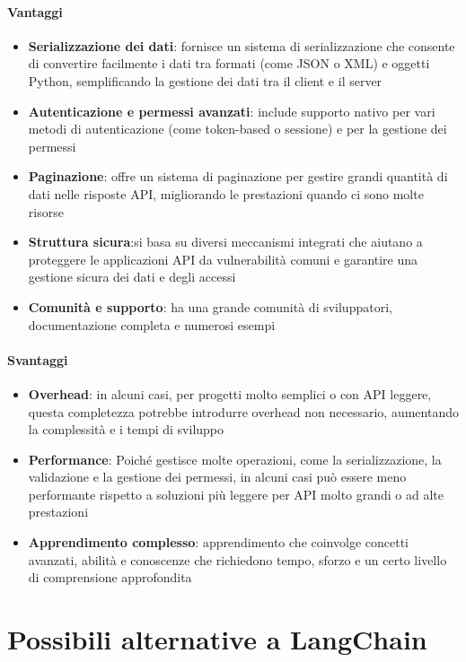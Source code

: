 \documentclass{article}
\begin{document}
\paragraph*{Vantaggi}
\begin{itemize}
    \item \textbf{Serializzazione dei dati}: fornisce un sistema di 
    serializzazione che consente di convertire facilmente i dati tra 
    formati (come JSON o XML) e oggetti Python, semplificando la 
    gestione dei dati tra il client e il server
    \item \textbf{Autenticazione e permessi avanzati}: include supporto 
    nativo per vari metodi di autenticazione (come token-based o 
    sessione) e per la gestione dei permessi
    \item \textbf{Paginazione}: offre un sistema di paginazione per 
    gestire grandi quantità di dati nelle risposte API, migliorando 
    le prestazioni quando ci sono molte risorse
    \item \textbf{Struttura sicura}:si basa su diversi meccanismi 
    integrati che aiutano a proteggere le applicazioni API da 
    vulnerabilità comuni e garantire una gestione sicura dei dati e 
    degli accessi
    \item \textbf{Comunità e supporto}: ha una grande comunità di 
    sviluppatori, documentazione completa e numerosi esempi
\end{itemize}
\paragraph*{Svantaggi}
\begin{itemize}
    \item \textbf{Overhead}: in alcuni casi, per progetti molto semplici 
    o con API leggere, questa completezza potrebbe introdurre overhead 
    non necessario, aumentando la complessità e i tempi di sviluppo
    \item \textbf{Performance}: Poiché  gestisce molte operazioni, come 
    la serializzazione, la validazione e la gestione dei permessi, in 
    alcuni casi può essere meno performante rispetto a soluzioni più 
    leggere per API molto grandi o ad alte prestazioni
    \item \textbf{Apprendimento complesso}: apprendimento che coinvolge 
    concetti avanzati, abilità e conoscenze che richiedono tempo, sforzo 
    e un certo livello di comprensione approfondita
\end{itemize}

\section{Possibili alternative a LangChain}
\end{document}
